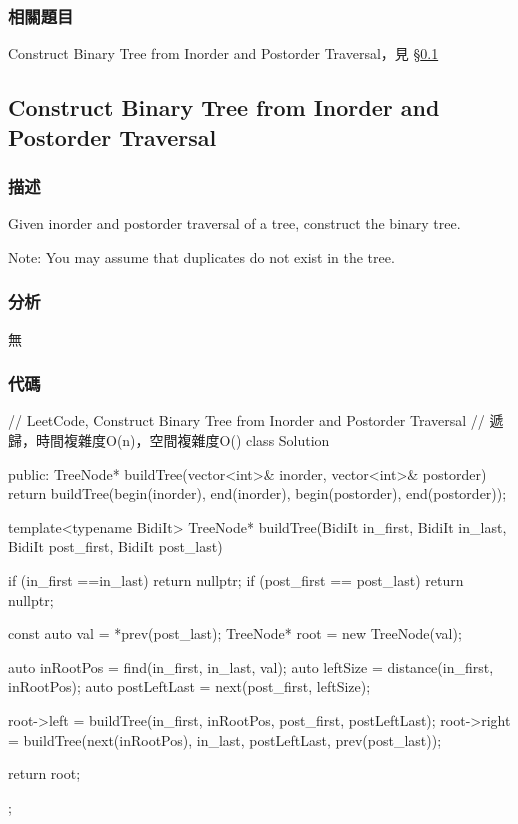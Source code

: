 \subsubsection{相關題目}
\begindot
\item Construct Binary Tree from Inorder and Postorder Traversal，見 \S \ref{sec:construct-binary-tree-from-inorder-and-postorder-traversal}
\myenddot


\subsection{Construct Binary Tree from Inorder and Postorder Traversal}
\label{sec:construct-binary-tree-from-inorder-and-postorder-traversal}


\subsubsection{描述}
Given inorder and postorder traversal of a tree, construct the binary tree.

Note:
You may assume that duplicates do not exist in the tree.


\subsubsection{分析}
無


\subsubsection{代碼}
\begin{Code}
// LeetCode, Construct Binary Tree from Inorder and Postorder Traversal
// 遞歸，時間複雜度O(n)，空間複雜度O(\logn)
class Solution {
public:
    TreeNode* buildTree(vector<int>& inorder, vector<int>& postorder) {
        return buildTree(begin(inorder), end(inorder),
                begin(postorder), end(postorder));
    }

    template<typename BidiIt>
    TreeNode* buildTree(BidiIt in_first, BidiIt in_last,
            BidiIt post_first, BidiIt post_last) {
        if (in_first ==in_last) return nullptr;
        if (post_first == post_last) return nullptr;

        const auto val = *prev(post_last);
        TreeNode* root = new TreeNode(val);

        auto inRootPos = find(in_first, in_last, val);
        auto leftSize = distance(in_first, inRootPos);
        auto postLeftLast = next(post_first, leftSize);

        root->left = buildTree(in_first, inRootPos, post_first, postLeftLast);
        root->right = buildTree(next(inRootPos), in_last, postLeftLast, prev(post_last));

        return root;
    }
};
\end{Code}


